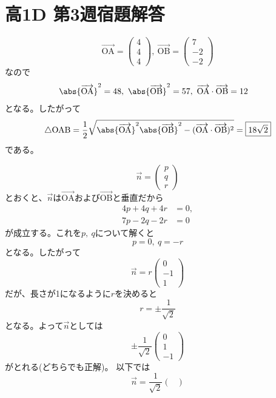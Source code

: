 \documentclass[dvipdfmx,uplatex,b5paper]{jsarticle}
\newcommand{\Vector}[1]{\overrightarrow{\text{#1}}}
\newcommand{\Innerprod}[2]{\Vector{#1}\cdot\Vector{#2}}
\begin{document}
\section*{高1D 第3週宿題解答}

\begin{enumarabicp}
  \item \[ \Vector{OA}=\begin{pmatrix}
    4 \\ 4 \\ 4
  \end{pmatrix},\ 
  \Vector{OB}= \begin{pmatrix}
    7 \\ -2 \\ -2
  \end{pmatrix} \]
  なので
  \begin{align*}
    \abs{\Vector{OA}}^2&=48,\ \abs{\Vector{OB}}^2=57,\ \Innerprod{OA}{OB} = 12
  \end{align*}
  となる。したがって
  \begin{align*}
    \triangle\text{OAB} = \frac{1}{2}\sqrt{\abs{\Vector{OA}}^2\abs{\Vector{OB}}^2-(\Innerprod{OA}{OB})^2} = \boxed{18\sqrt{2}}
  \end{align*}
  である。
  \item \[ \overrightarrow{n} = \begin{pmatrix}
    p \\ q \\ r
  \end{pmatrix} \]
  とおくと、$\overrightarrow{n}$は$\Vector{OA}$および$\Vector{OB}$と垂直だから
  \begin{align*}
    4p+4q+4r &= 0, \\
    7p-2q-2r &= 0
  \end{align*}
  が成立する。これを$p,\ q$について解くと
  \[ p=0,\ q=-r\]
  となる。したがって
  \[\overrightarrow{n}= r\begin{pmatrix}
    0 \\ -1 \\ 1
  \end{pmatrix} \]
  だが、長さが1になるように$r$を決めると
  \[ r=\pm \frac{1}{\sqrt{2}} \]
  となる。よって$\overrightarrow{n}$としては
  \[ \pm \frac{1}{\sqrt{2}}\begin{pmatrix}
    0 \\ 1 \\ -1
  \end{pmatrix} \]
  がとれる(どちらでも正解)。
  以下では
  \[ \overrightarrow{n}= \frac{1}{\sqrt{2}}\begin{pmatrix}

\end{pmatrix}\]
\end{enumarabicp}
\end{document}
